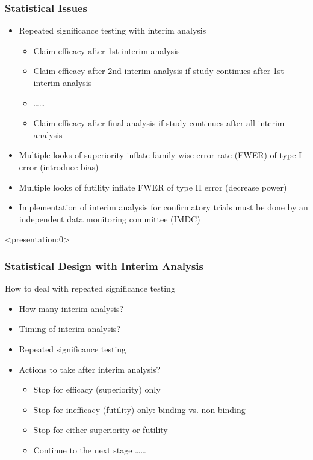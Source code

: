 \documentclass{beamer}
\begin{document}
\begin{frame}
	\frametitle{Statistical Issues}
\begin{itemize}
   \item Repeated significance testing with interim analysis
   \begin{itemize}
   	\item Claim efficacy after 1st interim analysis
   	\item Claim efficacy after 2nd interim analysis if study continues after 1st interim analysis
   	\item \ldots \ldots
   	\item Claim efficacy after final analysis if study continues after all interim analysis
   \end{itemize}
  	\item Multiple looks of superiority inflate family-wise error rate (FWER) of type I error (introduce bias)   
  	\item  Multiple looks of futility inflate FWER of type II error (decrease power)
  	\item Implementation of interim analysis for confirmatory trials must be done by an independent data monitoring committee (IMDC)
\end{itemize}
\end{frame}
\begin{frame}<presentation:0>
	\frametitle{Statistical Design with Interim Analysis}
How to deal with repeated significance testing \begin{itemize}
			\item How many interim analysis?
			\item Timing of interim analysis? 
		    \item Repeated significance testing
			\item Actions to take after interim analysis? \begin{itemize}
				\item Stop for efficacy (superiority) only
				\item Stop for inefficacy (futility) only: binding vs. non-binding
				\item Stop for either superiority or futility
				\item Continue to the next stage \ldots \ldots
		     \end{itemize} 
	\end{itemize}
\end{frame}\addtocounter{framenumber}{-1}
\end{document}
